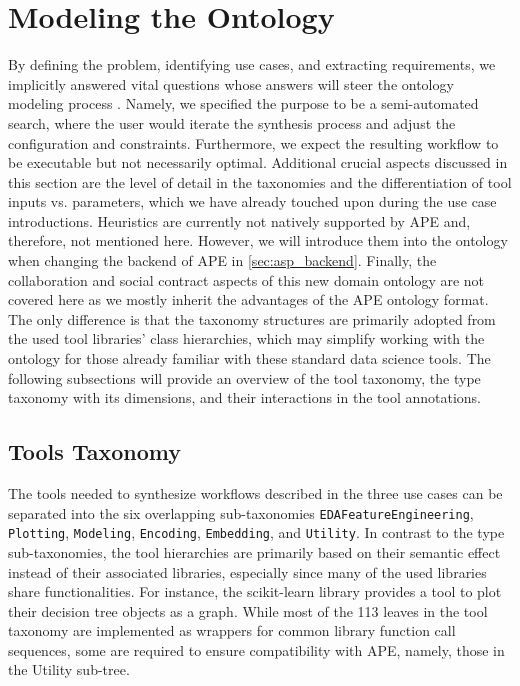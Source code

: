 \section{Modeling the Ontology}
By defining the problem, identifying use cases, and extracting requirements, we implicitly answered vital questions whose answers will steer the ontology modeling process \cite{noy2001ontology}. Namely, we specified the purpose to be a semi-automated search, where the user would iterate the synthesis process and adjust the configuration and constraints. Furthermore, we expect the resulting workflow to be executable but not necessarily optimal. Additional crucial aspects discussed in this section are the level of detail in the taxonomies and the differentiation of tool inputs vs. parameters, which we have already touched upon during the use case introductions. Heuristics are currently not natively supported by APE and, therefore, not mentioned here. However, we will introduce them into the ontology when changing the backend of APE in \autoref{sec:asp_backend}. Finally, the collaboration and social contract aspects of this new domain ontology are not covered here as we mostly inherit the advantages of the APE ontology format. The only difference is that the taxonomy structures are primarily adopted from the used tool libraries' class hierarchies, which may simplify working with the ontology for those already familiar with these standard data science tools. The following subsections will provide an overview of the tool taxonomy, the type taxonomy with its dimensions, and their interactions in the tool annotations.

\subsection{Tools Taxonomy}
The tools needed to synthesize workflows described in the three use cases can be separated into the six overlapping sub-taxonomies \verb|EDAFeatureEngineering|, \verb|Plotting|, \verb|Modeling|, \verb|Encoding|, \verb|Embedding|, and \verb|Utility|. In contrast to the type sub-taxonomies, the tool hierarchies are primarily based on their semantic effect instead of their associated libraries, especially since many of the used libraries share functionalities. For instance, the scikit-learn library provides a tool to plot their decision tree objects as a graph. While most of the 113 leaves in the tool taxonomy are implemented as wrappers for common library function call sequences, some are required to ensure compatibility with APE, namely, those in the Utility sub-tree.

